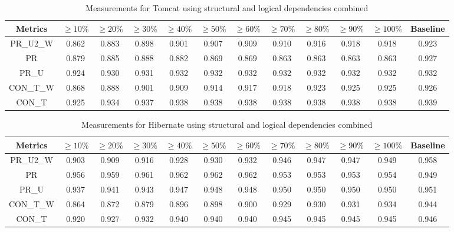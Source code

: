\documentclass[runningheads]{comsis2}
\begin{document}
\begin{table}[!h]
\renewcommand{\arraystretch}{1}
\caption{Measurements for Tomcat using structural and logical dependencies combined}
\label{tab:measurementscombined:tomcat}
\centering
\begin{tabular}{|c|cccccccccc|c|}
\hline
Metrics &	$\geq10\%$	&	$\geq20\%$		&	$\geq30\%$		&	$\geq40\%$		&	$\geq50\%$		&	$\geq60\%$		&	$\geq70\%$		&	$\geq80\%$		&	$\geq90\%$		&	$\geq100\%$		&	Baseline \\
\hline

PR\_U2\_W	&	0.862	&	0.883	&	0.898	&	0.901	&	0.907	&	0.909	&	0.910	&	0.916	&	0.918	&	0.918	&	0.923	\\
PR	&	0.879	&	0.885	&	0.888	&	0.882	&	0.869	&	0.869	&	0.863	&	0.863	&	0.863	&	0.863	&	0.927	\\
PR\_U	&	0.924	&	0.930	&	0.931	&	0.932	&	0.932	&	0.932	&	0.932	&	0.932	&	0.932	&	0.932	&	0.932	\\
CON\_T\_W	&	0.868	&	0.888	&	0.901	&	0.909	&	0.914	&	0.917	&	0.918	&	0.923	&	0.925	&	0.925	&	0.926	\\
CON\_T	&	0.925	&	0.934	&	0.937	&	0.938	&	0.938	&	0.938	&	0.938	&	0.938	&	0.938	&	0.938	&	0.939	\\
																										

\hline
\end{tabular}
\end{table}


\begin{table}[!h]
\renewcommand{\arraystretch}{1}
\caption{Measurements for Hibernate using structural and logical dependencies combined}
\label{tab:measurementscombined:hibernate}
\centering
\begin{tabular}{|c|cccccccccc|c|}
\hline
Metrics &	$\geq10\%$	&	$\geq20\%$		&	$\geq30\%$		&	$\geq40\%$		&	$\geq50\%$		&	$\geq60\%$		&	$\geq70\%$		&	$\geq80\%$		&	$\geq90\%$		&	$\geq100\%$		&	Baseline \\
\hline

PR\_U2\_W	&	0.903	&	0.909	&	0.916	&	0.928	&	0.930	&	0.932	&	0.946	&	0.947	&	0.947	&	0.949	&	0.958	\\
PR	&	0.956	&	0.959	&	0.961	&	0.962	&	0.962	&	0.962	&	0.953	&	0.953	&	0.953	&	0.954	&	0.949	\\
PR\_U	&	0.937	&	0.941	&	0.943	&	0.947	&	0.948	&	0.948	&	0.950	&	0.950	&	0.950	&	0.950	&	0.951	\\
CON\_T\_W	&	0.864	&	0.872	&	0.879	&	0.896	&	0.898	&	0.900	&	0.929	&	0.930	&	0.931	&	0.934	&	0.944	\\
CON\_T	&	0.920	&	0.927	&	0.932	&	0.940	&	0.940	&	0.940	&	0.945	&	0.945	&	0.945	&	0.945	&	0.946	\\

\hline
\end{tabular}
\end{table}
\end{document}
